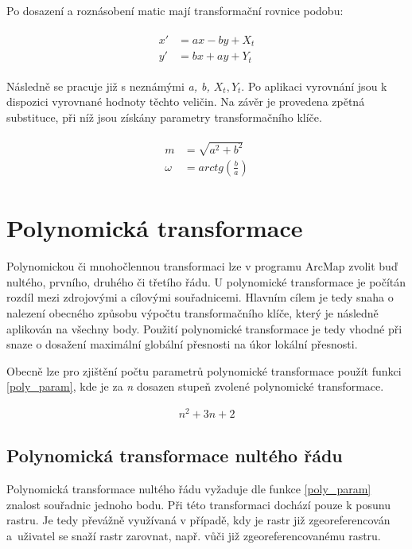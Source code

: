 \documentclass[thesis=M,czech]{FITthesis}[2012/06/26]
\begin{document}
Po dosazení a roznásobení matic mají transformační rovnice podobu:

 \begin{align}  \label{podobn_sub} 
\begin{split}
x' &= ax - by + X_t \\
y' &= bx + ay + Y_t
\end{split}
\end{align}

Následně se pracuje již s neznámými \textit{a, b, $X_t, Y_t$}. Po aplikaci vyrovnání jsou k dispozici vyrovnané hodnoty těchto veličin. Na závěr je provedena zpětná substituce, při níž jsou získány parametry transformačního klíče.

 \begin{align}  \label{podobn_sub} 
\begin{split}
m &= \sqrt{a^2 + b^2} \\
\omega &= arctg(\frac{b}{a})
\end{split}
\end{align}



\section{Polynomická transformace}
Polynomickou či mnohočlennou transformaci lze v programu ArcMap zvolit buď nultého, prvního, druhého či třetího řádu. U polynomické transformace je počítán rozdíl mezi zdrojovými a cílovými souřadnicemi. Hlavním cílem je tedy snaha o nalezení obecného způsobu výpočtu transformačního klíče, který je následně aplikován na všechny body. Použití polynomické transformace je tedy vhodné při snaze o dosažení maximální globální přesnosti na úkor lokální přesnosti.

Obecně lze pro zjištění počtu parametrů polynomické transformace použít funkci \eqref{poly_param}, kde je za \textit{n} dosazen stupeň zvolené polynomické transformace. 

\begin{align}
   \label{poly_param} n^2 + 3n + 2
\end{align}


\subsection{Polynomická transformace nultého řádu}
Polynomická transformace nultého řádu vyžaduje dle funkce \eqref{poly_param} znalost souřadnic jednoho bodu. Při této transformaci dochází pouze k posunu rastru. Je tedy převážně využívaná v případě, kdy je rastr již zgeoreferencován a~uživatel se snaží rastr zarovnat, např. vůči již zgeoreferencovanému rastru.
\end{document}
